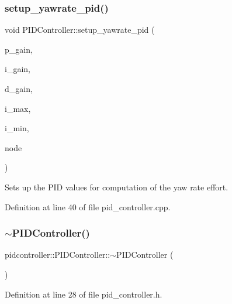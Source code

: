 \mbox{\label{group__test__utils_ga5d8a387440921ea68907364c0e1d7b5b}} 
\subsubsection{\texorpdfstring{setup\_yawrate\_pid()}{setup\_yawrate\_pid()}}
{\footnotesize\ttfamily void P\+I\+D\+Controller\+::setup\+\_\+yawrate\+\_\+pid (\begin{DoxyParamCaption}\item[{double}]{p\+\_\+gain,  }\item[{double}]{i\+\_\+gain,  }\item[{double}]{d\+\_\+gain,  }\item[{double}]{i\+\_\+max,  }\item[{double}]{i\+\_\+min,  }\item[{const ros\+::\+Node\+Handle \&}]{node }\end{DoxyParamCaption})}



Sets up the P\+ID values for computation of the yaw rate effort. 



Definition at line 40 of file pid\+\_\+controller.\+cpp.

\mbox{\label{group__test__utils_ga4ae30cc03173417fa6edb5c055966a3f}} 
\subsubsection{\texorpdfstring{$\sim$PIDController()}{~PIDController()}}
{\footnotesize\ttfamily pidcontroller\+::\+P\+I\+D\+Controller\+::$\sim$\+P\+I\+D\+Controller (\begin{DoxyParamCaption}{ }\end{DoxyParamCaption})\hspace{0.3cm}{\ttfamily [inline]}}



Definition at line 28 of file pid\+\_\+controller.\+h.

